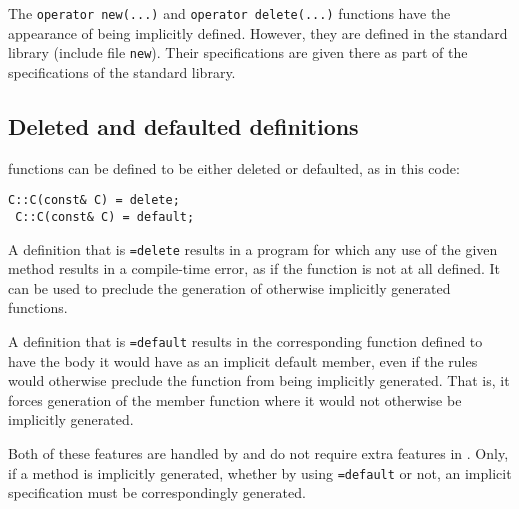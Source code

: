 
The \lstinline|operator new(...)| and 
\lstinline|operator delete(...)| functions have the appearance of being implicitly defined. However, they are defined in the standard library
(include file \lstinline|new|). Their specifications are given there as
part of the specifications of the standard library.

\subsection{Deleted and defaulted definitions}

 \lang functions can be defined to be either deleted or defaulted, as in this code:
 \begin{lstlisting}[deletekeywords={default}]
 C::C(const& C) = delete; 
 C::C(const& C) = default; 
 \end{lstlisting}
 A definition that is \lstinline|=delete| results in a program for which any use of the given method results in a compile-time error,
 as if the function is not at all defined. It can be used to preclude the
 generation of otherwise implicitly generated functions.
 
 A definition that is \lstinline|=default| results in the corresponding
 function defined to have the body it would have as an implicit default
 member, even if the \lang rules would otherwise preclude the 
 function from being implicitly generated. That is, it forces 
 generation of the member function where it would not otherwise be implicitly generated.
 
Both of these features are handled by \lang and do not require 
extra features in \NAME. Only, if a method is implicitly generated, whether by using \lstinline|=default| or not, an implicit specification must be correspondingly generated.
